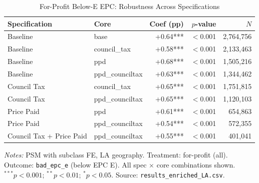 \begin{table}[htbp]
\centering
\caption{For-Profit Below-E EPC: Robustness Across Specifications}
\label{tab:h2_bad_epc_e_robust}
\begin{tabular}{llrrr}
\toprule
Specification & Core & Coef (pp) & $p$-value & $N$ \\
\midrule
Baseline & base & +0.64*** & $<$0.001 & 2,764,756 \\
Baseline & council\_tax & +0.58*** & $<$0.001 & 2,133,463 \\
Baseline & ppd & +0.68*** & $<$0.001 & 1,505,216 \\
Baseline & ppd\_counciltax & +0.63*** & $<$0.001 & 1,344,462 \\
Council Tax & council\_tax & +0.65*** & $<$0.001 & 1,751,815 \\
Council Tax & ppd\_counciltax & +0.65*** & $<$0.001 & 1,120,103 \\
Price Paid & ppd & +0.61*** & $<$0.001 & 654,863 \\
Price Paid & ppd\_counciltax & +0.54*** & $<$0.001 & 572,355 \\
Council Tax + Price Paid & ppd\_counciltax & +0.55*** & $<$0.001 & 401,041 \\
\bottomrule
\end{tabular}
\begin{minipage}{0.9\textwidth}
\vspace{4pt}
\footnotesize
\textit{Notes:} PSM with subclass FE, LA geography.
Treatment: for-profit (all). Outcome: \texttt{bad\_epc\_e} (below EPC E).
All spec $\times$ core combinations shown.
$^{***}p<0.001$; $^{**}p<0.01$; $^{*}p<0.05$.
Source: \texttt{results\_enriched\_LA.csv}.
\end{minipage}
\end{table}
